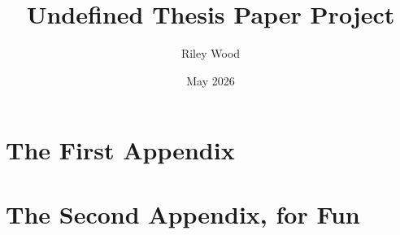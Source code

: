\documentclass[
	12pt,
    twoside,
    bibstyle=ieee,
    bibfile=bibliography.bib,
    headerstyle=uppercase,
]{reedthesis}
\title{Undefined Thesis Paper Project}
\author{Riley Wood}
\date{May 2026}
\theoremstyle{definition}%
\theoremstyle{sltheorem}%
\numberwithin{assumption}{section}
\numberwithin{definition}{section}
\numberwithin{remark}{section}
\numberwithin{example}{section}
\numberwithin{proposition}{section}
\numberwithin{theorem}{section}
\numberwithin{lemma}{section}
\numberwithin{corollary}{section}
\numberwithin{conjecture}{section}
\numberwithin{application}{section}
\begin{document}
  \maketitle
  \frontmatter %
  \pagestyle{empty} %




    \tableofcontents

%   
%   

  \mainmatter %
  \pagestyle{fancyplain} %
%  

	
  
  


    \appendix
      \chapter{The First Appendix}
      \chapter{The Second Appendix, for Fun}



  \backmatter %

    \nocite{*}

\printbibliography[heading=bibintoc]

\end{document}
